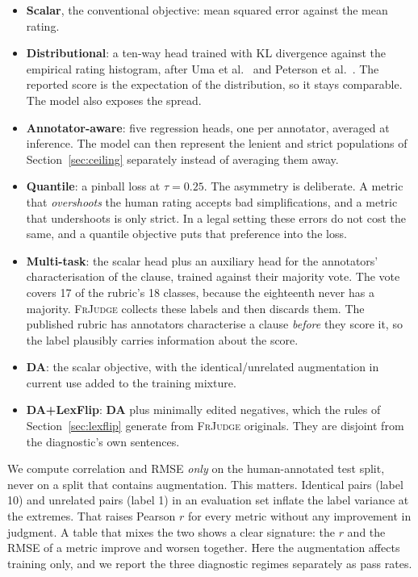 \documentclass{BVP_JCLLT}
\begin{document}
{\begin{itemize}\itemsep2pt
\item \textbf{Scalar}, the conventional objective: mean squared error against
  the mean rating.
\item \textbf{Distributional}: a ten-way head trained with KL divergence against
  the empirical rating histogram, after Uma et al.\ \cite{uma2021learning} and
  Peterson et al.\ \cite{peterson2019human}. The reported score is the
  expectation of the distribution, so it stays comparable. The model also
  exposes the spread.
\item \textbf{Annotator-aware}: five regression heads, one per annotator,
  averaged at inference. The model can then represent the lenient and strict
  populations of Section~\ref{sec:ceiling} separately instead of averaging them
  away.
\item \textbf{Quantile}: a pinball loss \cite{koenker1978regression} at
  $\tau=0.25$. The asymmetry is deliberate. A metric that \emph{overshoots} the
  human rating accepts bad simplifications, and a metric that undershoots is
  only strict. In a legal setting these errors do not cost the same, and a
  quantile objective puts that preference into the loss.
\item \textbf{Multi-task}: the scalar head plus an auxiliary head for the
  annotators' characterisation of the clause, trained against their majority
  vote. The vote covers 17 of the rubric's 18 classes, because the eighteenth
  never has a majority. \textsc{FrJudge} collects these labels and then discards
  them. The published rubric has annotators characterise a clause \emph{before}
  they score it, so the label plausibly carries information about the score.
\item \textbf{DA}: the scalar objective, with the identical/unrelated
  augmentation in current use added to the training mixture.
\item \textbf{DA+LexFlip}: \textbf{DA} plus minimally edited negatives, which
  the rules of Section~\ref{sec:lexflip} generate from \textsc{FrJudge}
  originals. They are disjoint from the diagnostic's own sentences.
\end{itemize}

We compute correlation and RMSE \emph{only} on the human-annotated test split,
never on a split that contains augmentation. This matters. Identical pairs
(label 10) and unrelated pairs (label 1) in an evaluation set inflate the label
variance at the extremes. That raises Pearson $r$ for every metric without any
improvement in judgment. A table that mixes the two shows a clear signature: the
$r$ and the RMSE of a metric improve and worsen together. Here the augmentation
affects training only, and we report the three diagnostic regimes separately as
pass rates.

}
\end{document}
